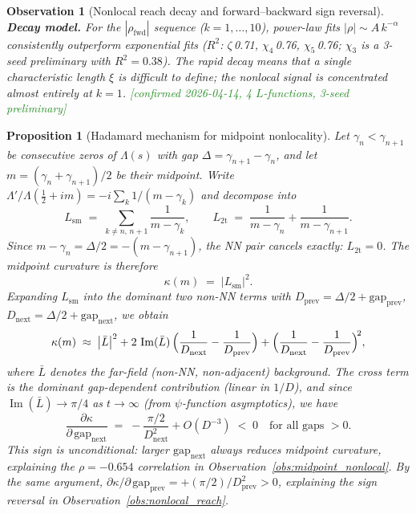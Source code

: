 \documentclass[11pt, a4paper]{article}
\theoremstyle{definition}
\theoremstyle{plain}
\newtheorem{proposition}[theorem]{Proposition}
\newtheorem{observation}[theorem]{Observation}
\begin{document}
\begin{observation}[Nonlocal reach decay and forward--backward sign reversal]
\smallskip\noindent
\textbf{Decay model.}
For the $|\rho_{\mathrm{fwd}}|$ sequence ($k=1,\dots,10$),
power-law fits $|\rho| \sim A\,k^{-\alpha}$ consistently outperform
exponential fits ($R^2$: $\zeta$\,0.71, $\chi_4$\,0.76, $\chi_5$\,0.76;
$\chi_3$ is a 3-seed preliminary with $R^2 = 0.38$).
The rapid decay means that a single characteristic length $\xi$
is difficult to define; the nonlocal signal is concentrated almost
entirely at $k{=}1$.
\textcolor{ForestGreen}{[confirmed 2026-04-14, 4 $L$-functions, 3-seed preliminary]}
\end{observation}



\begin{proposition}[Hadamard mechanism for midpoint nonlocality]
\label{prop:midpoint_hadamard}
Let $\gamma_n < \gamma_{n+1}$ be consecutive zeros of $\Lambda(s)$
with gap $\Delta = \gamma_{n+1} - \gamma_n$, and let
$m = (\gamma_n + \gamma_{n+1})/2$ be their midpoint.
Write $\Lambda'/\Lambda(\tfrac{1}{2}+im) = -i\sum_k 1/(m-\gamma_k)$
and decompose into
\[
  L_{\mathrm{sm}} \;=\; \sum_{k \neq n,\, n+1} \frac{1}{m - \gamma_k},
  \qquad
  L_{\mathrm{2t}} \;=\; \frac{1}{m - \gamma_n} + \frac{1}{m - \gamma_{n+1}}.
\]
Since $m - \gamma_n = \Delta/2 = -(m - \gamma_{n+1})$, the NN pair
cancels exactly: $L_{\mathrm{2t}} = 0$.
The midpoint curvature is therefore
\begin{equation}\label{eq:kappa_midpoint_hadamard}
  \kappa(m) \;=\; |L_{\mathrm{sm}}|^2.
\end{equation}
Expanding $L_{\mathrm{sm}}$ into the dominant two non-NN terms
with $D_{\mathrm{prev}} = \Delta/2 + \mathrm{gap}_{\mathrm{prev}}$,
$D_{\mathrm{next}} = \Delta/2 + \mathrm{gap}_{\mathrm{next}}$, we obtain
\begin{equation}\label{eq:kappa_cross_mechanism}
  \kappa(m) \;\approx\;
    \bigl|\bar{L}\bigr|^2
    + 2\,\operatorname{Im}(\bar{L})\,
      \Bigl(\frac{1}{D_{\mathrm{next}}} - \frac{1}{D_{\mathrm{prev}}}\Bigr)
    + \Bigl(\frac{1}{D_{\mathrm{next}}} - \frac{1}{D_{\mathrm{prev}}}\Bigr)^{\!2},
\end{equation}
where $\bar{L}$ denotes the far-field (non-NN, non-adjacent) background.
The cross term is the dominant gap-dependent contribution (linear in
$1/D$), and since $\operatorname{Im}(\bar{L}) \to \pi/4$ as
$t \to \infty$ (from $\psi$-function asymptotics), we have
\[
  \frac{\partial\kappa}{\partial\,\mathrm{gap}_{\mathrm{next}}}
  \;=\; -\frac{\pi/2}{D_{\mathrm{next}}^2} + O(D^{-3})
  \;<\; 0
  \quad\text{for all gaps } > 0.
\]
This sign is unconditional: larger $\mathrm{gap}_{\mathrm{next}}$
always reduces midpoint curvature, explaining the $\rho = -0.654$
correlation in Observation~\ref{obs:midpoint_nonlocal}.
By the same argument, $\partial\kappa/\partial\,\mathrm{gap}_{\mathrm{prev}}
= +(\pi/2)/D_{\mathrm{prev}}^2 > 0$, explaining the sign reversal in
Observation~\ref{obs:nonlocal_reach}.
\end{proposition}
\end{document}
